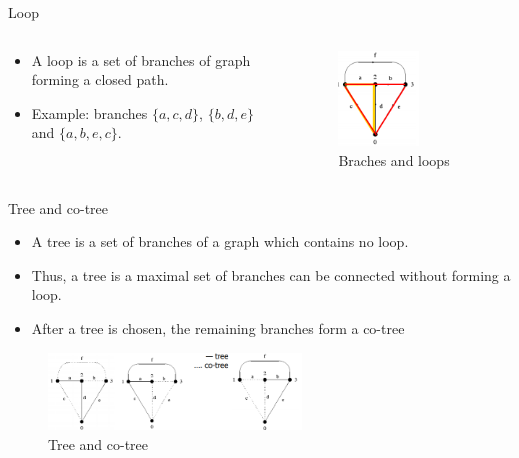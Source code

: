 \documentclass[xcolor=dvipsnames]{beamer}
\begin{document}
\begin{frame}{Loop}
    \begin{columns}
        \begin{column}{.45\textwidth}
 		\begin{itemize}
			\item A loop is a set of branches of graph forming a closed path.
			\item Example: branches $\{a,c,d\}$, $\{b,d,e\}$ and $\{a,b,e,c\}$.		
		\end{itemize}
        \end{column}
		\begin{column}{.55\textwidth}
 		\begin{figure}[!ht]
  			\centering
    		\includegraphics[width=0.6\textwidth]{loop.png}
   			 \caption[figure 3]{Braches and loops}
    		\label{fig:eg3}
    	\end{figure}
      	\end{column}
    \end{columns}
\end{frame}

\begin{frame}{Tree and co-tree}
\begin{itemize}
		\item A {\color{purple}tree} is a set of branches of a graph which contains no loop. 
		\item Thus, a tree is a maximal set of branches can be connected without forming a loop.
		\item After a tree is chosen, the remaining branches form a {\color{purple}co-tree}
\end{itemize}	
 		\begin{figure}[!ht]
  			\centering
    		\includegraphics[width=0.6\textwidth]{tree1.png}
   			 \caption[figure 3]{Tree and co-tree}
    	\end{figure}
\end{frame}
\end{document}
